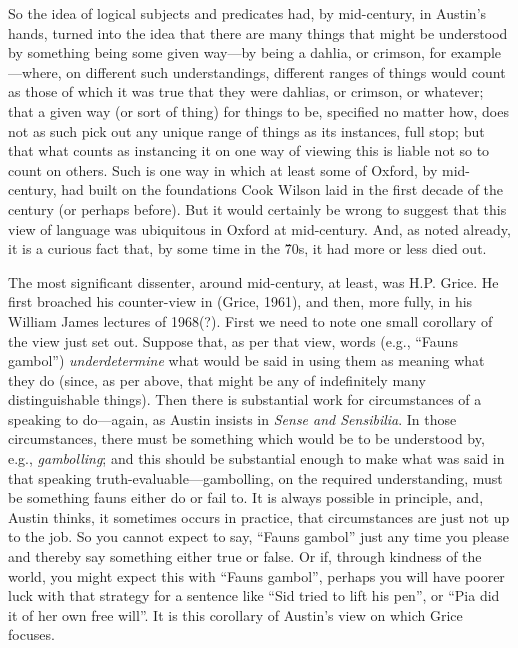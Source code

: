 So the idea of logical subjects and predicates had, by mid-century, in Austin's hands, turned into the idea that there are many things that might be understood by something being some given way---by being a dahlia, or crimson, for example---where, on different such understandings, different ranges of things would count as those of which it was true that they were dahlias, or crimson, or whatever; that a given way (or sort of thing) for things to be, specified no matter how, does not as such pick out any unique range of things as its instances, full stop; but that what counts as instancing it on one way of viewing this is liable not so to count on others. Such is one way in which at least some of Oxford, by mid-century, had built on the foundations Cook Wilson laid in the first decade of the century (or perhaps before). But it would certainly be wrong to suggest that this view of language was ubiquitous in Oxford at mid-century. And, as noted already, it is a curious fact that, by some time in the \'70s, it had more or less died out.

The most significant dissenter, around mid-century, at least, was H.P. Grice. He first broached his counter-view in (Grice, 1961), and then, more fully, in his William James lectures of 1968(?). First we need to note one small corollary of the view just set out. Suppose that, as per that view, words (e.g., ``Fauns gambol'') \emph{underdetermine} what would be said in using them as meaning what they do (since, as per above, that might be any of indefinitely many distinguishable things). Then there is substantial work for circumstances of a speaking to do---again, as Austin insists in \emph{Sense and Sensibilia}. In those circumstances, there must be something which would be to be understood by, e.g., \emph{gambolling}; and this should be substantial enough to make what was said in that speaking truth-evaluable---gambolling, on the required understanding, must be something fauns either do or fail to. It is always possible in principle, and, Austin thinks, it sometimes occurs in practice, that circumstances are just not up to the job. So you cannot expect to say, ``Fauns gambol'' just any time you please and thereby say something either true or false. Or if, through kindness of the world, you might expect this with ``Fauns gambol'', perhaps you will have poorer luck with that strategy for a sentence like ``Sid tried to lift his pen'', or ``Pia did it of her own free will''. It is this corollary of Austin’s view on which Grice focuses.

